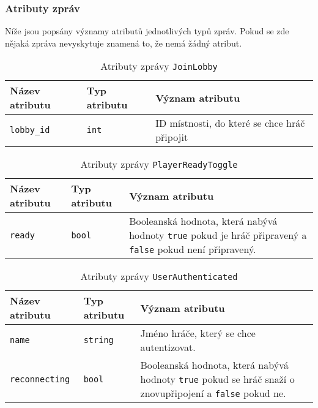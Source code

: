 \documentclass[12pt, a4paper]{article}
\begin{document}
		\subsubsection{Atributy zpráv}
		Níže jsou popsány významy atributů jednotlivých typů zpráv. Pokud se zde nějaká zpráva nevyskytuje znamená to, že nemá žádný atribut.
		
		
\begin{center}
		\begin{table}[!ht]
		     \caption{Atributy zprávy \texttt{JoinLobby}}
		\begin{tabularx}{\textwidth}{|l|l|X|}
			\hline
			\textbf{Název atributu} & \textbf{Typ atributu} & \textbf{Význam atributu} \\ 
			\hline
			\texttt{lobby\_id}          &\texttt{int}&ID místnosti, do které se chce hráč připojit\\
			\hline
		\end{tabularx}
		\end{table}
\end{center}  		
		
\begin{center}
		\begin{table}[!ht]
		     \caption{Atributy zprávy \texttt{PlayerReadyToggle}}
		\begin{tabularx}{\textwidth}{|l|l|X|}
			\hline
			\textbf{Název atributu} & \textbf{Typ atributu} & \textbf{Význam atributu} \\ 
			\hline
			\texttt{ready}          &\texttt{bool}&Booleanská hodnota, která nabývá hodnoty \texttt{true} pokud je hráč připravený a \texttt{false} pokud není připravený.\\
			\hline
		\end{tabularx}
		\end{table}
\end{center}  
		
\begin{center}
		\begin{table}[!ht]
		     \caption{Atributy zprávy \texttt{UserAuthenticated}}
		\begin{tabularx}{\textwidth}{|l|l|X|}
			\hline
			\textbf{Název atributu} & \textbf{Typ atributu} & \textbf{Význam atributu} \\ 
			\hline
			\texttt{name}          &\texttt{string}&Jméno hráče, který se chce autentizovat.\\
			\hline
			\texttt{reconnecting}          &\texttt{bool}&Booleanská hodnota, která nabývá hodnoty \texttt{true} pokud se hráč snaží o znovupřipojení a \texttt{false} pokud ne.\\
			\hline
		\end{tabularx}
		\end{table}
\end{center}  
\end{document}
